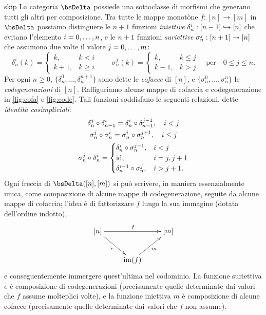 \begin{hRemark}{skip}\label{rmk_combinatoria_simplessi}
	La categoria \(\bsDelta\) possiede una sottoclasse di morfismi che generano tutti gli altri per composizione. Tra tutte le mappe monotòne \(f : [n]\to [m]\) in \(\bsDelta\) possiamo distinguere le \(n+1\) funzioni \emph{iniettive} \(\delta_n^i : [n-1]\hookrightarrow [n]\) che evitano l'elemento \(i=\iter[0]n\), e le \(n+1\) funzioni \emph{suriettive} \(\sigma_n^j : [n+1]\twoheadrightarrow [n]\) che assumono due volte il valore  \(j=\iter[0]m\):
	\[
		\delta_n^i(k) =
		\begin{cases}
			k,   & k < i    \\
			k+1, & k \geq i
		\end{cases}
		\quad \quad
		\sigma_n^j (k) =
		\begin{cases}
			k,   & k \leq j \\
			k-1, & k > j
		\end{cases}
		\quad \text{per} \quad 0 \leq j\leq n.
	\]
	Per ogni \(n\ge 0\), \(\{\delta_n^0,\dots,\delta_n^{n+1}\}\) sono dette le \emph{cofacce} di \([n]\), e \(\{\sigma_n^0,\dots, \sigma_n^n\}\) le \emph{codegenerazioni} di \([n]\). Raffiguriamo alcune mappe di cofaccia e codegenerazione in \autoref{fig:cofa} e \ref{fig:code}. Tali funzioni soddisfano le seguenti relazioni, dette \emph{identità cosimpliciali}:
	\begin{gather*}
		\delta_n^j \circ \delta_{n-1}^i = \delta_n^i \circ \delta_{n-1}^{j-1}, \quad i < j\\
		\sigma_n^j \circ \sigma_n^i = \sigma_n^i \circ \sigma_n^{j+1}, \quad i \leq j\\
		\sigma_n^j \circ \delta_n^i =
		\begin{cases}
			\delta_n^i \circ \sigma_n^{j-1}, & i < j      \\
			\mathrm{id},                            & i = j, j+1 \\
			\delta_n^{i-1} \circ \sigma_n^j, & i > j+1.
		\end{cases}
	\end{gather*}
	Ogni freccia di \(\Hom\bsDelta([n],[m])\) si può scrivere, in maniera essenzialmente unica, come composizione di alcune mappe di codegenerazione, seguite da alcune mappe di cofaccia; l'idea è di fattorizzare \(f\) lungo la sua immagine (dotata dell'ordine indotto),
	\[\xymatrix{
			[n]\ar[rr]^f\ar[dr]_e &&	[m] \\
			& \im(f) \ar[ur]_m
		}\]
	e conseguentemente immergere quest'ultima nel codominio. La funzione suriettiva \(e\) è composizione di codegenerazioni (precisamente quelle determinate dai valori che \(f\) assume molteplici volte), e la funzione iniettiva \(m\) è composizione di alcune cofacce (precisamente quelle determinate dai valori che \(f\) non assume).
\end{hRemark}
